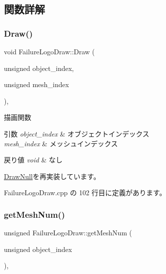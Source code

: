 \subsection{関数詳解}
\mbox{\label{class_failure_logo_draw_a8ee20e1697bbbaf7f41c18334830488a}} 
\subsubsection{\texorpdfstring{Draw()}{Draw()}}
{\footnotesize\ttfamily void Failure\+Logo\+Draw\+::\+Draw (\begin{DoxyParamCaption}\item[{unsigned}]{object\+\_\+index,  }\item[{unsigned}]{mesh\+\_\+index }\end{DoxyParamCaption})\hspace{0.3cm}{\ttfamily [override]}, {\ttfamily [virtual]}}



描画関数 


\begin{DoxyParams}{引数}
{\em object\+\_\+index} & オブジェクトインデックス \\
\hline
{\em mesh\+\_\+index} & メッシュインデックス \\
\hline
\end{DoxyParams}

\begin{DoxyRetVals}{戻り値}
{\em void} & なし \\
\hline
\end{DoxyRetVals}


\mbox{\hyperlink{class_draw_null_a72ac0b7dc40b1469582419dcc5b0e114}{Draw\+Null}}を再実装しています。



 Failure\+Logo\+Draw.\+cpp の 102 行目に定義があります。

\mbox{\label{class_failure_logo_draw_a45bb5d0965ca73b06ae0836f27f9b0e3}} 
\subsubsection{\texorpdfstring{get\+Mesh\+Num()}{getMeshNum()}}
{\footnotesize\ttfamily unsigned Failure\+Logo\+Draw\+::get\+Mesh\+Num (\begin{DoxyParamCaption}\item[{unsigned}]{object\+\_\+index }\end{DoxyParamCaption})\hspace{0.3cm}{\ttfamily [override]}, {\ttfamily [virtual]}}



